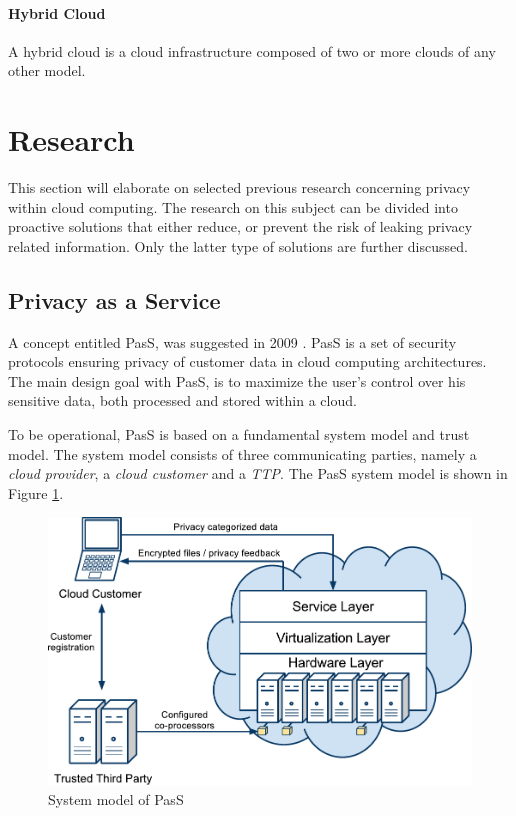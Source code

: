 \documentclass[pdftex,english,10pt,b5paper,twoside]{book}
\begin{document}
\paragraph{Hybrid Cloud} A hybrid cloud is a cloud infrastructure composed of
two or more clouds of any other model.

\section{Research}

This section will elaborate on selected previous research concerning privacy
within cloud computing. The research on this subject can be divided into
proactive solutions that either reduce, or prevent the risk of leaking privacy
related information. Only the latter type of solutions are further discussed.

\subsection{Privacy as a Service}

A concept entitled \ac{PasS}, was suggested in 2009 \cite{PasS}. \ac{PasS} is a set
of security protocols ensuring privacy of customer data in cloud computing
architectures. The main design goal with \ac{PasS}, is to maximize the user's control
over his sensitive data, both processed and stored within a cloud.

To be operational, \ac{PasS} is based on a fundamental system model and trust
model. The system model consists of three communicating parties, namely a
\emph{cloud provider}, a \emph{cloud customer} and a \emph{\ac{TTP}}. The
\ac{PasS} system model is shown in Figure \ref{fig:RW:PasS}. 

\begin{figure}[h!]
    \centering
    \includegraphics[scale=0.6]{ArchitecturePasS.pdf}
    \caption{System model of PasS}
    \label{fig:RW:PasS}
\end{figure}
\end{document}
